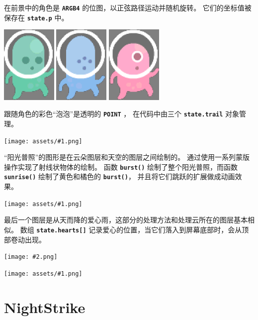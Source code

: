 \documentclass[10pt]{book}
\newcommand{\png}[1]{
\begin{center}
\texttt{[image: assets/\#1.png]}
\end{center}
}
\newcommand{\szpng}[2]{
\begin{center}
\texttt{[image: \#2.png]}
\end{center}
}
\newcommand{\mach}[1]{\texttt{\textbf{#1}}}
\begin{document}
\begin{CJK}{UTF8}{gkai}
\newpage
在前景中的角色是 \mach{ARGB4} 的位图，以正弦路径运动并随机旋转。
它们的坐标值被保存在 \mach{state.p} 中。
\begin{center}
\includegraphics[width=0.2\textwidth]{previews/kenney-PLAYER1-00.png}
\includegraphics[width=0.2\textwidth]{previews/kenney-PLAYER1-01.png}
\includegraphics[width=0.2\textwidth]{previews/kenney-PLAYER1-02.png}
\end{center}
跟随角色的彩色``泡泡''是透明的 \mach{POINT} ， 在代码中由三个 \mach{state.trail} 对象管理。
\png{kenney_3}

``阳光普照''的图形是在云朵图层和天空的图层之间绘制的。
通过使用一系列蒙版操作实现了射线状物体的绘制。
函数 \mach{burst()} 绘制了整个阳光普照，而函数
\mach{sunrise()} 绘制了黄色和橘色的 \mach{burst()}， 并且将它们跳跃的扩展做成动画效果。

\png{kenney_4}

最后一个图层是从天而降的爱心雨，这部分的处理方法和处理云所在的图层基本相似。
数组 \mach{state.hearts[]} 记录爱心的位置，当它们落入到屏幕底部时，会从顶部卷动出现。
\szpng{0.2}{previews/kenney-HEART-00}

\png{kenney_5}

\newpage
\section{NightStrike}
\label{nightstrike}


\end{CJK}
\end{document}
